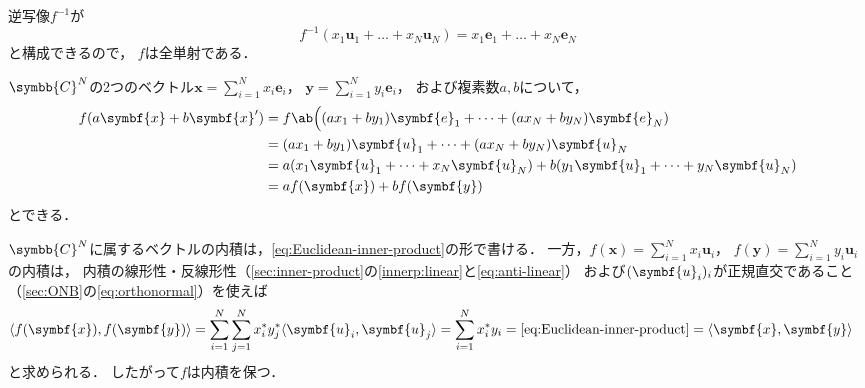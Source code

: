 \documentclass[
]{sotsu}
\begin{document}
\quad
逆写像$f^{-1}$が
\begin{equation*}
    f^{-1} (x_1 \symbf{u}_1 + \dots + x_N \symbf{u}_N)
        = x_1 \symbf{e}_1 + \dots + x_N \symbf{e}_N
\end{equation*}
と構成できるので，
$f$は全単射である．


\quad 
$\symbb{C}^N$の2つのベクトル$\symbf{x} = \sum_{i = 1}^{N} x_i \symbf{e}_i$，
$\symbf{y} = \sum_{i = 1}^{N} y_i \symbf{e}_i$，
および複素数$a, b$について，
\begin{equation*}
    \begin{split}
        f(a \symbf{x} + b \symbf{x}')
            &= f \ab\Big(
                    (a x_1 + b y_1) \symbf{e}_1
                    + \dots + 
                    (a x_N + b y_N) \symbf{e}_N
                )
            \\
            &= (a x_1 + b y_1) \symbf{u}_1
                + \dots + 
                (a x_N + b y_N) \symbf{u}_N
            \\
            &= a (x_1 \symbf{u}_1 + \dots + x_N \symbf{u}_N)
             + b (y_1 \symbf{u}_1 + \dots + y_N \symbf{u}_N)
            \\
            &= a f(\symbf{x}) + b f(\symbf{y})
    \end{split}
\end{equation*}
とできる．


\quad
$\symbb{C}^N$に属するベクトルの内積は，\cref{eq:Euclidean-inner-product}の形で書ける．
一方，$f(\symbf{x}) = \sum_{i = 1}^{N} x_i \symbf{u}_i$，
$f(\symbf{y}) = \sum_{i = 1}^{N} y_i \symbf{u}_i$の内積は，
内積の線形性・反線形性（\cref{sec:inner-product}の\cref{innerp:linear}と\cref{eq:anti-linear}）
および$\sequ{\symbf{u}_i}[i]$が正規直交であること（\cref{sec:ONB}の\cref{eq:orthonormal}）を使えば
\begin{equation*}
    \begin{split}
        \iparen{ f(\symbf{x}), f(\symbf{y}) }
        &= \sum_{i = 1}^{N} \sum_{j = 1}^{N}
            \conj{x_i} \conj{y_j}
            \iparen{\symbf{u}_i, \symbf{u}_j}
        = \sum_{i = 1}^{N} \conj{x_i} y_i
        = \text{\cref{eq:Euclidean-inner-product}}
        = \iparen{\symbf{x}, \symbf{y}}
    \end{split}
\end{equation*}
と求められる．
したがって$f$は内積を保つ．
\end{document}
